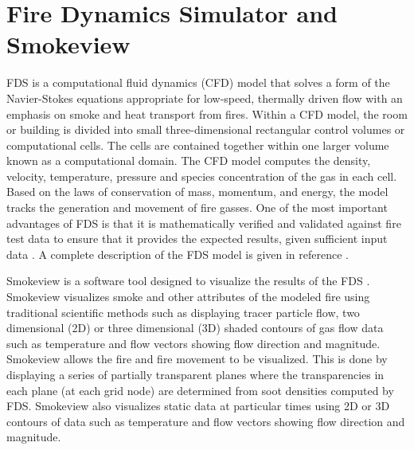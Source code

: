 \documentclass[11pt,oneside]{book}
\begin{document}
\chapter{Fire Dynamics Simulator and Smokeview}
FDS is a computational fluid dynamics (CFD) model that solves a form of the Navier-Stokes equations appropriate for low-speed, thermally driven flow with an emphasis on smoke and heat transport from fires.  Within a CFD model, the room or building is divided into small three-dimensional rectangular control volumes or computational cells.  The cells are contained together within one larger volume known as a computational domain.  The CFD model computes the density, velocity, temperature, pressure and species concentration of the gas in each cell.  Based on the laws of conservation of mass, momentum,  and energy, the model tracks the generation and movement of fire gasses. One of the most important advantages of FDS is that it is  mathematically verified \cite{FDS_Verification_Guide} and validated against fire test data to ensure that it provides the expected results, given sufficient input data \cite{FDS_Validation_Guide}.  A complete description of the FDS model is given in reference \cite{FDS_Tech_Guide}.

Smokeview is a software tool designed to visualize the results of the FDS \cite{Smokeview_Users_Guide}.  Smokeview visualizes smoke and other attributes of the modeled fire using traditional scientific methods such as displaying tracer particle flow, two dimensional (2D) or three dimensional (3D) shaded contours of gas flow data such as temperature and flow vectors showing flow direction and magnitude.  Smokeview allows the fire and fire movement to be visualized.  This is done by displaying a series of partially transparent planes where the transparencies in each plane (at each grid node) are determined from soot densities computed by FDS.  Smokeview also visualizes static data at particular times using 2D or 3D contours of data such as temperature and flow vectors showing flow direction and magnitude.
\end{document}
